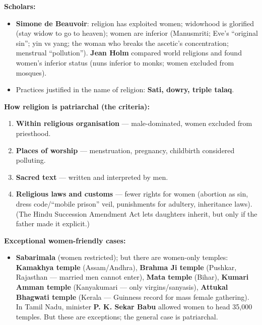 \begin{DataFact}
\textbf{Scholars:}
\begin{itemize}
\item \textbf{Simone de Beauvoir}: religion has exploited women; widowhood is glorified (stay widow to go to heaven); women are inferior (Manusmriti; Eve's ``original sin''; yin vs yang; the woman who breaks the ascetic's concentration; menstrual ``pollution''). \textbf{Jean Holm} compared world religions and found women's inferior status (nuns inferior to monks; women excluded from mosques).
\item Practices justified in the name of religion: \textbf{Sati, dowry, triple talaq}.
\end{itemize}
\end{DataFact}

\begin{DataFact}
\textbf{How religion is patriarchal (the criteria):}
\begin{enumerate}
\item \textbf{Within religious organisation} --- male-dominated, women excluded from priesthood.
\item \textbf{Places of worship} --- menstruation, pregnancy, childbirth considered polluting.
\item \textbf{Sacred text} --- written and interpreted by men.
\item \textbf{Religious laws and customs} --- fewer rights for women (abortion as sin, dress code/``mobile prison'' veil, punishments for adultery, inheritance laws). (The Hindu Succession Amendment Act lets daughters inherit, but only if the father made it explicit.)
\end{enumerate}
\end{DataFact}

\begin{ExampleBox}
\textbf{Exceptional women-friendly cases:}
\begin{itemize}
\item \textbf{Sabarimala} (women restricted); but there are women-only temples: \textbf{Kamakhya temple} (Assam/Andhra), \textbf{Brahma Ji temple} (Pushkar, Rajasthan --- married men cannot enter), \textbf{Mata temple} (Bihar), \textbf{Kumari Amman temple} (Kanyakumari --- only virgins/sanyasis), \textbf{Attukal Bhagwati temple} (Kerala --- Guinness record for mass female gathering). In Tamil Nadu, minister \textbf{P. K. Sekar Babu} allowed women to head 35,000 temples. But these are exceptions; the general case is patriarchal.
\end{itemize}
\end{ExampleBox}

